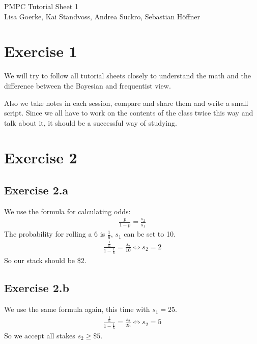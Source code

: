 \documentclass{article}
\begin{document}
\begin{center}
\LARGE PMPC Tutorial Sheet 1\\
\small Lisa Goerke, Kai Standvoss, Andrea Suckro, Sebastian H\"offner
\end{center}
\vspace{0.5cm}
\normalsize

\section*{Exercise 1}
We will try to follow all tutorial sheets closely to understand the math and the 
difference between the Bayesian and frequentist view. 

Also we take notes in each session, compare and share them and write a small script. 
Since we all have to work on the contents of the class twice this way and talk about 
it, it should be a successful way of studying.

\section*{Exercise 2}
\subsection*{Exercise 2.a}

We use the formula for calculating odds:
\begin{align}
\frac{p}{1-p} = \frac{s_2}{s_1}
\end{align}
The probability for rolling a 6 is $\frac{1}{6}$, $s_1$ can be set to 10.
\begin{align}
\frac{\frac{1}{6}}{1-\frac{1}{6}} = \frac{s_2}{10} \Leftrightarrow s_2 = 2
\end{align}
So our stack should be \$2.


\subsection*{Exercise 2.b}
We use the same formula again, this time with $s_1=25$.
\begin{align}
\frac{\frac{1}{6}}{1-\frac{1}{6}} = \frac{s_2}{25} \Leftrightarrow s_2 = 5
\end{align}
So we accept all stakes $s_2 \geq \$ 5$.
\end{document}
